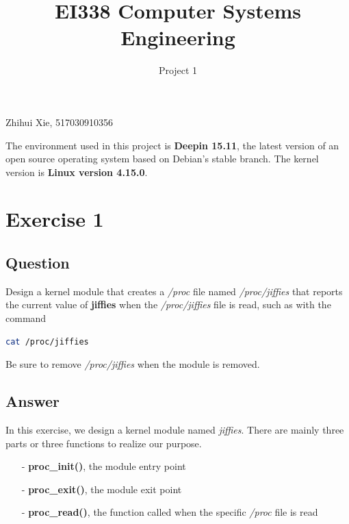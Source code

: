\documentclass{article}
\title{EI338 Computer Systems Engineering}
\author{Project 1}
\begin{document}
\maketitle

\begin{center}
    Zhihui Xie, 517030910356
\end{center}

The environment used in this project is \textbf{Deepin 15.11}, the latest version of an open source operating system based on Debian's stable branch. The kernel version is \textbf{Linux version 4.15.0}.

\section*{Exercise 1}
    \subsection*{Question}
    Design a kernel module that creates a \textit{/proc} file named \textit{/proc/jiffies}
    that reports the current value of \textbf{jiffies} when the \textit{/proc/jiffies} file
    is read, such as with the command

    \vspace{2pt}

    \begin{lstlisting}[language=bash]
cat /proc/jiffies
    \end{lstlisting}

    \vspace{2pt}

    Be sure to remove \textit{/proc/jiffies} when the module is removed.
        
    \subsection*{Answer} In this exercise, we design a kernel module named \textit{jiffies}. There are mainly three parts or three functions to realize our purpose.
    \begin{enumerate}
        \item[-] \textbf{proc\_init()}, the module entry point 
        \item[-] \textbf{proc\_exit()}, the module exit point
        \item[-] \textbf{proc\_read()}, the function called when the specific \textit{/proc} file is read  
    \end{enumerate}
\end{document}
